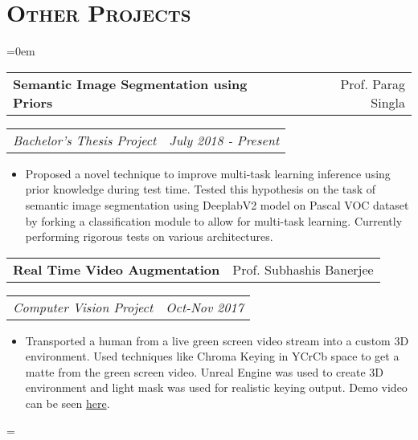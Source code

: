 \documentclass{article}
\makeatletter
\newenvironment{longversion}{}{} %
\newenvironment{absolutelynopagebreak}
  {\par\nobreak\vfil\penalty0\vfilneg
   \vtop\bgroup}
  {\par\xdef\tpd{\the\prevdepth}\egroup
   \prevdepth=\tpd}
\newcommand{\headerrow}[2]
{\begin{tabular*}{\linewidth}{l@{\extracolsep{\fill}}r}
	#1 &
	#2 \\
\end{tabular*}}
\newcommand{\tmpsection}[1]{}
\let\tmpsection=\section
\renewcommand{\section}[1]{\tmpsection*{\textsc{#1}}}
\makeatother
\begin{document}
\begin{absolutelynopagebreak}
\begin{longversion}
\section{Other Projects}
\begin{list} {}{\leftmargin=0em}
\setlength{\leftmargin}{0pt}

\item[]
\headerrow {\textbf{Semantic Image Segmentation using Priors}}{Prof. Parag Singla}
\headerrow {\emph{Bachelor's Thesis Project}}{\emph{July 2018 - Present}}
\begin{itemize} \item[] 
Proposed a novel technique to improve multi-task learning inference using prior knowledge during test time. Tested this hypothesis on the task of semantic image segmentation using DeeplabV2 model on Pascal VOC dataset by forking a classification module to allow for multi-task learning. Currently performing rigorous tests on various architectures.
\end{itemize}

\item[]
\headerrow {\textbf{Real Time Video Augmentation}}{Prof. Subhashis Banerjee}
\headerrow {\emph{Computer Vision Project}}{\emph{Oct-Nov 2017}}
\begin{itemize} \item[]
    Transported a human from a live green screen video stream into a custom 3D environment. Used techniques like Chroma Keying in YCrCb space to get a matte from the green screen video. Unreal Engine was used to create 3D environment and light mask was used for realistic keying output. Demo video can be seen \href{https://github.com/ozym4nd145/Vision_Project/blob/master/demo_video/shashank_result.avi?raw=true}{here}.
\end{itemize}


\end{list}
\end{longversion}
\end{absolutelynopagebreak}
\end{document}

